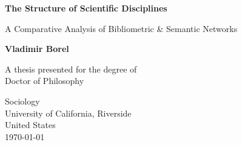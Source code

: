 \begin{titlepage}
    \begin{center}
        \vspace*{1cm}
 
        \textbf{The Structure of Scientific Disciplines}
 
        \vspace{0.5cm}
         A Comparative Analysis of Bibliometric \& Semantic Networks

        \vspace{1.5cm}
 
        \textbf{Vladimir Borel}
 
        \vfill

        A thesis presented for the degree of\\
        Doctor of Philosophy

        \vspace{0.8cm}

        Sociology\\
        University of California, Riverside\\
        United States\\
        \today
             
    \end{center}
 \end{titlepage}
 